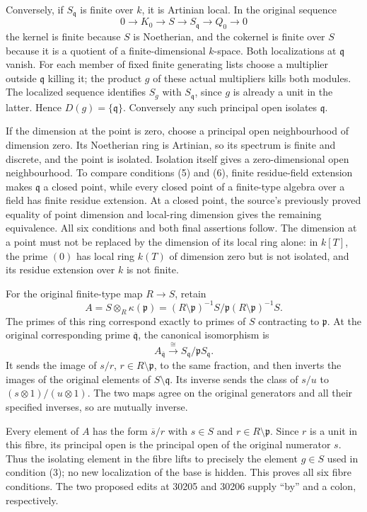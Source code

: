 Conversely, if \(S_{\mathfrak q}\) is finite over \(k\), it is Artinian local. In the original sequence \[
 0\to K_0\to S\to S_{\mathfrak q}\to Q_0\to0
\] the kernel is finite because \(S\) is Noetherian, and the cokernel is finite over \(S\) because it is a quotient of a finite-dimensional \(k\)-space. Both localizations at \(\mathfrak q\) vanish. For each member of fixed finite generating lists choose a multiplier outside \(\mathfrak q\) killing it; the product \(g\) of these actual multipliers kills both modules. The localized sequence identifies \(S_g\) with \(S_{\mathfrak q}\), since \(g\) is already a unit in the latter. Hence \(D(g)=\{\mathfrak q\}\). Conversely any such principal open isolates \(\mathfrak q\).

If the dimension at the point is zero, choose a principal open neighbourhood of dimension zero. Its Noetherian ring is Artinian, so its spectrum is finite and discrete, and the point is isolated. Isolation itself gives a zero-dimensional open neighbourhood. To compare conditions (5) and (6), finite residue-field extension makes \(\mathfrak q\) a closed point, while every closed point of a finite-type algebra over a field has finite residue extension. At a closed point, the source's previously proved equality of point dimension and local-ring dimension gives the remaining equivalence. All six conditions and both final assertions follow. The dimension at a point must not be replaced by the dimension of its local ring alone: in \(k[T]\), the prime \((0)\) has local ring \(k(T)\) of dimension zero but is not isolated, and its residue extension over \(k\) is not finite.

For the original finite-type map \(R\to S\), retain \[
 A=S\otimes_R\kappa(\mathfrak p)
   =(R\setminus\mathfrak p)^{-1}S/
            \mathfrak p(R\setminus\mathfrak p)^{-1}S.
\] The primes of this ring correspond exactly to primes of \(S\) contracting to \(\mathfrak p\). At the original corresponding prime \(\overline{\mathfrak q}\), the canonical isomorphism is \[
 A_{\overline{\mathfrak q}}\xrightarrow{\cong}
 S_{\mathfrak q}/\mathfrak pS_{\mathfrak q}.
\] It sends the image of \(s/r\), \(r\in R\setminus\mathfrak p\), to the same fraction, and then inverts the images of the original elements of \(S\setminus\mathfrak q\). Its inverse sends the class of \(s/u\) to \((s\otimes1)/(u\otimes1)\). The two maps agree on the original generators and all their specified inverses, so are mutually inverse.

Every element of \(A\) has the form \(\overline s/r\) with \(s\in S\) and \(r\in R\setminus\mathfrak p\). Since \(r\) is a unit in this fibre, its principal open is the principal open of the original numerator \(s\). Thus the isolating element in the fibre lifts to precisely the element \(g\in S\) used in condition (3); no new localization of the base is hidden. This proves all six fibre conditions. The two proposed edits at 30205 and 30206 supply ``by'' and a colon, respectively.

